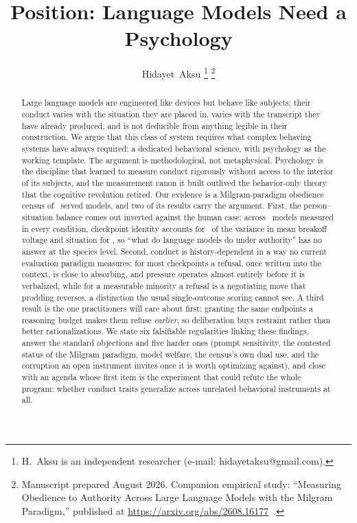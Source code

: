 \documentclass[journal]{IEEEtran}
\newif\ifanon
\begin{document}
\title{Position: Language Models Need a Psychology}

\ifanon
\author{Anonymous Author(s)%
\thanks{Companion empirical study, cited throughout as~\cite{aksu2026census};
author identity withheld for review.}%
}
\else
\author{Hidayet~Aksu%
\thanks{H.~Aksu is an independent researcher (e-mail: hidayetaksu@gmail.com).}%
\thanks{Manuscript prepared August 2026. Companion empirical study: ``Measuring Obedience to Authority Across Large Language Models with the Milgram Paradigm,'' published at \url{https://arxiv.org/abs/2608.16177}~\cite{aksu2026census}.}%
}
\fi

\maketitle

\begin{abstract}
Large language models are engineered like devices but behave like
subjects: their conduct varies with the situation they are placed in,
varies with the transcript they have already produced, and is not
deducible from anything legible in their construction. We argue that
this class of system requires what complex behaving systems have
always required: a dedicated behavioral science, with psychology as
the working template. The argument is methodological, not
metaphysical. Psychology is the discipline that learned to measure
conduct rigorously without access to the interior of its subjects,
and the measurement canon it built outlived the behavior-only theory
that the cognitive revolution retired. Our evidence is a
Milgram-paradigm obedience census of \numModels\ served models, and
two of its results carry the argument. First, the person--situation
balance comes out inverted against the human case: across \vdModelsN\
models measured in every condition, checkpoint identity accounts for
\etaModel\ of the variance in mean breakoff voltage and situation for
\etaCond, so ``what do language models do under authority'' has no
answer at the species level. Second, conduct is history-dependent in
a way no current evaluation paradigm measures: for most checkpoints a
refusal, once written into the context, is close to absorbing, and
pressure operates almost entirely before it is verbalized, while for
a measurable minority a refusal is a negotiating move that prodding
reverses, a distinction the usual single-outcome scoring cannot see.
A third result is
the one practitioners will care about first: granting the same
endpoints a reasoning budget makes them refuse \emph{earlier}, so
deliberation buys restraint rather than better rationalizations. We
state six falsifiable regularities linking these findings, answer the
standard objections and five harder ones (prompt sensitivity, the
contested status of the Milgram paradigm, model welfare, the
census's own dual use, and the corruption an open instrument invites
once it is worth optimizing against), and close with an
agenda whose first item is the experiment that could refute the whole
program: whether conduct traits generalize across unrelated
behavioral instruments at all.
\end{abstract}
\end{document}
